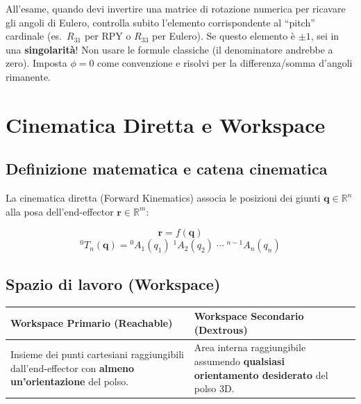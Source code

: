 \documentclass[11pt, a4paper]{article}
\begin{document}
\begin{examinfo}
All'esame, quando devi invertire una matrice di rotazione numerica per ricavare gli angoli di
Eulero, controlla subito l'elemento corrispondente al ``pitch'' cardinale
(es.\ $R_{31}$ per RPY o $R_{33}$ per Eulero).
Se questo elemento è $\pm1$, sei in una \textbf{singolarità}!
Non usare le formule classiche (il denominatore andrebbe a zero).
Imposta $\phi = 0$ come convenzione e risolvi per la differenza/somma d'angoli rimanente.
\end{examinfo}

\section{Cinematica Diretta e Workspace}

\subsection{Definizione matematica e catena cinematica}

La cinematica diretta (Forward Kinematics) associa le posizioni dei giunti
$\mathbf{q} \in \mathbb{R}^n$ alla posa dell'end-effector $\mathbf{r} \in \mathbb{R}^m$:
\begin{formulabox}
\[
\mathbf{r} = f(\mathbf{q})
\]
\[
{}^0T_n(\mathbf{q}) = {}^0A_1(q_1)\;{}^1A_2(q_2)\;\cdots\;{}^{n-1}A_n(q_n)
\]
\end{formulabox}

\subsection{Spazio di lavoro (Workspace)}

\begin{center}
\renewcommand{\arraystretch}{1.4}
\begin{tabular}{p{5.5cm}p{7cm}}
\toprule
\textbf{Workspace Primario (Reachable)} & \textbf{Workspace Secondario (Dextrous)}\\
\midrule
Insieme dei punti cartesiani raggiungibili
dall'end-effector con \textbf{almeno un'orientazione}
del polso. &
Area interna raggiungibile assumendo
\textbf{qualsiasi orientamento desiderato}
del polso 3D.\\
\bottomrule
\end{tabular}
\end{center}
\end{document}
